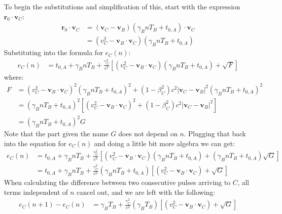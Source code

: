 \documentclass[a4paper]{article}
\theoremstyle{plain}
\theoremstyle{definition}
\newcommand{\vect}[1]{\mathbf{#1}}
\begin{document}
To begin the substitutions and simplification of this, start with the
expression $\vect{r}_0 \cdot \vect{v}_C$:
\begin{align*}
\vect{r}_0 \cdot \vect{v}_C
  & = (\vect{v}_C - \vect{v}_B) (\gamma_B n T_B + t_{0,A}) \cdot \vect{v}_C \\
  & = (v_C^2 - \vect{v}_B \cdot \vect{v}_C) (\gamma_B nT_B + t_{0,A})
\end{align*}
Substituting into the formula for $e_C(n)$:
\begin{align*}
e_{C}(n) & = t_{0,A} + \gamma_B nT_B + \frac{\gamma_C^2}{c^2} \left[ (v_C^2 - \vect{v}_B \cdot \vect{v}_C) (\gamma_B nT_B + t_{0,A}) + \sqrt{F} \right]
\end{align*}
where:
\begin{align*}
F & = (v_C^2 - \vect{v}_B \cdot \vect{v}_C)^2 (\gamma_B nT_B + t_{0,A})^2 + (1-\beta_C^2)c^2 |\vect{v}_C - \vect{v}_B|^2 (\gamma_B nT_B + t_{0,A})^2 \\
  & = (\gamma_B nT_B + t_{0,A})^2 \left[ (v_C^2 - \vect{v}_B \cdot \vect{v}_C)^2  + (1-\beta_C^2)c^2 |\vect{v}_C - \vect{v}_B|^2 \right] \\
  & = (\gamma_B nT_B + t_{0,A})^2 G
\end{align*}
Note that the part given the name $G$ does not depend on $n$.
Plugging that back into the equation for $e_C(n)$ and doing a little
bit more algebra we can get:
\begin{align*}
e_{C}(n)
  & = t_{0,A} + \gamma_B nT_B + \frac{\gamma_C^2}{c^2} \left[ (v_C^2 - \vect{v}_B \cdot \vect{v}_C) (\gamma_B nT_B + t_{0,A}) + (\gamma_B nT_B + t_{0,A}) \sqrt{G} \right] \\
  & = t_{0,A} + \gamma_B nT_B + \frac{\gamma_C^2}{c^2} (\gamma_B nT_B + t_{0,A}) \left[ (v_C^2 - \vect{v}_B \cdot \vect{v}_C) + \sqrt{G} \right]
\end{align*}
When calculating the difference between two consecutive pulses
arriving to $C$, all terms independent of $n$ cancel out, and we are
left with the following:
\begin{align*}
e_{C}(n+1) - e_{C}(n)
  & = \gamma_B T_B + \frac{\gamma_C^2}{c^2} (\gamma_B T_B) \left[ (v_C^2 - \vect{v}_B \cdot \vect{v}_C) + \sqrt{G} \right]
\end{align*}
\end{document}

